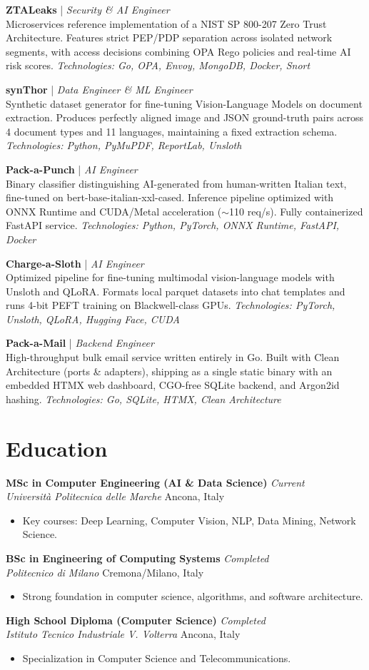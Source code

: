 \documentclass[a4paper,10pt]{article}
\newcommand{\cventry}[4]{
  \noindent\textbf{#1} \hfill \textit{#2}\\
  \textit{#3} \hfill #4\vspace{0.3em}
}
\newcommand{\projectentry}[3]{
  \noindent\textbf{#1} | \textit{#2}\\
  #3\vspace{0.3em}
}
\begin{document}
\projectentry{ZTALeaks}{Security \& AI Engineer}{Microservices reference implementation of a NIST SP 800-207 Zero Trust Architecture. Features strict PEP/PDP separation across isolated network segments, with access decisions combining OPA Rego policies and real-time AI risk scores. \textit{Technologies: Go, OPA, Envoy, MongoDB, Docker, Snort}}

\projectentry{synThor}{Data Engineer \& ML Engineer}{Synthetic dataset generator for fine-tuning Vision-Language Models on document extraction. Produces perfectly aligned image and JSON ground-truth pairs across 4 document types and 11 languages, maintaining a fixed extraction schema. \textit{Technologies: Python, PyMuPDF, ReportLab, Unsloth}}

\projectentry{Pack-a-Punch}{AI Engineer}{Binary classifier distinguishing AI-generated from human-written Italian text, fine-tuned on bert-base-italian-xxl-cased. Inference pipeline optimized with ONNX Runtime and CUDA/Metal acceleration ($\sim$110 req/s). Fully containerized FastAPI service. \textit{Technologies: Python, PyTorch, ONNX Runtime, FastAPI, Docker}}

\projectentry{Charge-a-Sloth}{AI Engineer}{Optimized pipeline for fine-tuning multimodal vision-language models with Unsloth and QLoRA. Formats local parquet datasets into chat templates and runs 4-bit PEFT training on Blackwell-class GPUs. \textit{Technologies: PyTorch, Unsloth, QLoRA, Hugging Face, CUDA}}

\projectentry{Pack-a-Mail}{Backend Engineer}{High-throughput bulk email service written entirely in Go. Built with Clean Architecture (ports \& adapters), shipping as a single static binary with an embedded HTMX web dashboard, CGO-free SQLite backend, and Argon2id hashing. \textit{Technologies: Go, SQLite, HTMX, Clean Architecture}}

\section{Education}
\cventry{MSc in Computer Engineering (AI \& Data Science)}{Current}{Università Politecnica delle Marche}{Ancona, Italy}
\vspace{-0.5em}
\begin{itemize}[leftmargin=1.5em, itemsep=0pt, topsep=0pt]
  \item Key courses: Deep Learning, Computer Vision, NLP, Data Mining, Network Science.
\end{itemize}

\vspace{0.5em}
\cventry{BSc in Engineering of Computing Systems}{Completed}{Politecnico di Milano}{Cremona/Milano, Italy}
\vspace{-0.5em}
\begin{itemize}[leftmargin=1.5em, itemsep=0pt, topsep=0pt]
  \item Strong foundation in computer science, algorithms, and software architecture.
\end{itemize}

\vspace{0.5em}
\cventry{High School Diploma (Computer Science)}{Completed}{Istituto Tecnico Industriale V. Volterra}{Ancona, Italy}
\vspace{-0.5em}
\begin{itemize}[leftmargin=1.5em, itemsep=0pt, topsep=0pt]
  \item Specialization in Computer Science and Telecommunications.
\end{itemize}
\end{document}
